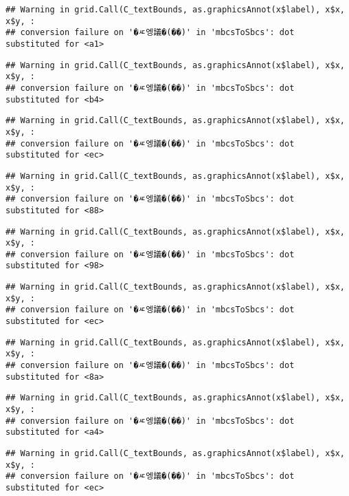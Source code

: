 \documentclass[
]{article}
\begin{document}
\begin{verbatim}
## Warning in grid.Call(C_textBounds, as.graphicsAnnot(x$label), x$x, x$y, :
## conversion failure on '�ㅼ엥議�(��)' in 'mbcsToSbcs': dot substituted for <a1>
\end{verbatim}

\begin{verbatim}
## Warning in grid.Call(C_textBounds, as.graphicsAnnot(x$label), x$x, x$y, :
## conversion failure on '�ㅼ엥議�(��)' in 'mbcsToSbcs': dot substituted for <b4>
\end{verbatim}

\begin{verbatim}
## Warning in grid.Call(C_textBounds, as.graphicsAnnot(x$label), x$x, x$y, :
## conversion failure on '�ㅼ엥議�(��)' in 'mbcsToSbcs': dot substituted for <ec>
\end{verbatim}

\begin{verbatim}
## Warning in grid.Call(C_textBounds, as.graphicsAnnot(x$label), x$x, x$y, :
## conversion failure on '�ㅼ엥議�(��)' in 'mbcsToSbcs': dot substituted for <88>
\end{verbatim}

\begin{verbatim}
## Warning in grid.Call(C_textBounds, as.graphicsAnnot(x$label), x$x, x$y, :
## conversion failure on '�ㅼ엥議�(��)' in 'mbcsToSbcs': dot substituted for <98>
\end{verbatim}

\begin{verbatim}
## Warning in grid.Call(C_textBounds, as.graphicsAnnot(x$label), x$x, x$y, :
## conversion failure on '�ㅼ엥議�(��)' in 'mbcsToSbcs': dot substituted for <ec>
\end{verbatim}

\begin{verbatim}
## Warning in grid.Call(C_textBounds, as.graphicsAnnot(x$label), x$x, x$y, :
## conversion failure on '�ㅼ엥議�(��)' in 'mbcsToSbcs': dot substituted for <8a>
\end{verbatim}

\begin{verbatim}
## Warning in grid.Call(C_textBounds, as.graphicsAnnot(x$label), x$x, x$y, :
## conversion failure on '�ㅼ엥議�(��)' in 'mbcsToSbcs': dot substituted for <a4>
\end{verbatim}

\begin{verbatim}
## Warning in grid.Call(C_textBounds, as.graphicsAnnot(x$label), x$x, x$y, :
## conversion failure on '�ㅼ엥議�(��)' in 'mbcsToSbcs': dot substituted for <ec>
\end{verbatim}
\end{document}
